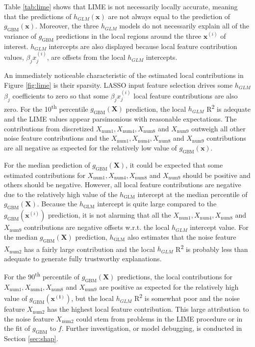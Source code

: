 \documentclass[sigconf, review]{acmart}
\begin{document}
Table \ref{tab:lime} shows that LIME is not necessarily locally accurate, meaning that the predictions of $h_{GLM}(\mathbf{x})$ are not always equal to the prediction of $g_{\text{GBM}}(\mathbf{x})$. Moreover, the three $h_{GLM}$ models do not necessarily explain all of the variance of $g_{\text{GBM}}$ predictions in the local regions around the three $\mathbf{x}^{(i)}$ of interest. $h_{GLM}$ intercepts are also displayed because local feature contribution values, $\beta_j x_j^{(i)}$, are offsets from the local $h_{GLM}$ intercepts.

An immediately noticeable characteristic of the estimated local contributions in Figure \ref{fig:lime} is their sparsity. LASSO input feature selection drives some $h_{GLM}$ $\beta_j$ coefficients to zero so that some $\beta_j x_j^{(i)}$ local feature contributions are also zero. For the 10\textsuperscript{th} percentile $g_{\text{GBM}}(\mathbf{X})$ prediction, the local $h_{GLM}$ R\textsuperscript{2} is adequate and the LIME values appear parsimonious with reasonable expectations. The contributions from discretized $X_{\text{num}1}, X_{\text{num}4}, X_{\text{num}8}$ and $X_{\text{num}9}$ outweigh all other noise feature contributions and the $X_{\text{num}1}, X_{\text{num}4}, X_{\text{num}8}$ and $X_{\text{num}9}$ contributions are all negative as expected for the relatively low value of $g_{\text{GBM}}(\mathbf{x})$. 

For the median prediction of $g_{\text{GBM}}(\mathbf{X})$, it could be expected that some estimated contributions for $X_{\text{num}1}, X_{\text{num}4}, X_{\text{num}8}$ and $X_{\text{num}9}$ should be positive and others should be negative. However, all local feature contributions are negative due to the relatively high value of the $h_{\text{GLM}}$ intercept at the median percentile of $g_{\text{GBM}}(\mathbf{X})$. Because the $h_{\text{GLM}}$ intercept is quite large compared to the $g_{\text{GBM}}(\mathbf{x}^{(i)})$ prediction, it is not alarming that all the $X_{\text{num}1}, X_{\text{num}4}, X_{\text{num}8}$ and $X_{\text{num}9}$ contributions are negative offsets w.r.t. the local $h_{GLM}$ intercept value. For the median $g_{\text{GBM}}(\mathbf{X})$ prediction, $h_{\text{GLM}}$ also estimates that the noise feature $X_{\text{num}2}$ has a fairly large contribution and the local $h_{GLM}$ R\textsuperscript{2} is probably less than adequate to generate fully trustworthy explanations.

For the 90\textsuperscript{th} percentile of $g_{\text{GBM}}(\mathbf{X})$ predictions, the local contributions for $X_{\text{num}1}, X_{\text{num}4}, X_{\text{num}8}$ and $X_{\text{num}9}$ are positive as expected for the relatively high value of $g_{\text{GBM}}(\mathbf{x^{(i)}})$, but the local $h_{GLM}$ R\textsuperscript{2} is somewhat poor and the noise feature $X_{\text{num}2}$ has the highest local feature contribution. This large attribution to the noise feature $X_{\text{num}2}$ could stem from problems in the LIME procedure or in the fit of $g_{\text{GBM}}$ to $f$. Further investigation, or model debugging, is conducted in Section \ref{sec:shap}.
\end{document}
